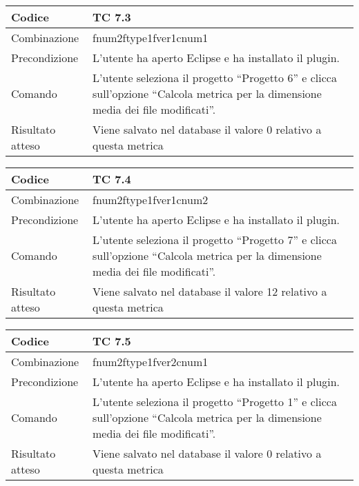 \begin{table}[ht]
\begin{tabular}{|p{3cm}|p{9cm}|}
\hline
\cellcolor{lightgray}Codice				& TC 7.3								\\
\hline
\cellcolor{lightgray}Combinazione		& fnum2ftype1fver1cnum1								\\
\hline
\cellcolor{lightgray}Precondizione		& L'utente ha aperto Eclipse e ha installato il plugin.					\\
\hline
\cellcolor{lightgray}Comando			& L'utente seleziona il progetto ``Progetto 6''  e clicca sull'opzione ``Calcola metrica per la dimensione media dei file modificati''.	\\
\hline
\cellcolor{lightgray}Risultato atteso	& Viene salvato nel database il valore 0 relativo a questa metrica	\\
\hline
\end{tabular}
\end{table}

\begin{table}[ht]
\begin{tabular}{|p{3cm}|p{9cm}|}
\hline
\cellcolor{lightgray}Codice				& TC 7.4								\\
\hline
\cellcolor{lightgray}Combinazione		& fnum2ftype1fver1cnum2							\\
\hline
\cellcolor{lightgray}Precondizione		& L'utente ha aperto Eclipse e ha installato il plugin.			\\
\hline
\cellcolor{lightgray}Comando			& L'utente seleziona il progetto ``Progetto 7''  e clicca sull'opzione ``Calcola metrica per la dimensione media dei file modificati''.	\\
\hline
\cellcolor{lightgray}Risultato atteso	& Viene salvato nel database il valore 12 relativo a questa metrica	\\
\hline
\end{tabular}
\end{table}

\begin{table}[ht]
\begin{tabular}{|p{3cm}|p{9cm}|}
\hline
\cellcolor{lightgray}Codice				& TC 7.5								\\
\hline
\cellcolor{lightgray}Combinazione		& fnum2ftype1fver2cnum1 									\\
\hline
\cellcolor{lightgray}Precondizione		& L'utente ha aperto Eclipse e ha installato il plugin.			\\
\hline
\cellcolor{lightgray}Comando			& L'utente seleziona il progetto ``Progetto 1''  e clicca sull'opzione ``Calcola metrica per la dimensione media dei file modificati''.	\\
\hline
\cellcolor{lightgray}Risultato atteso	& Viene salvato nel database il valore 0 relativo a questa metrica	\\
\hline
\end{tabular}
\end{table}

